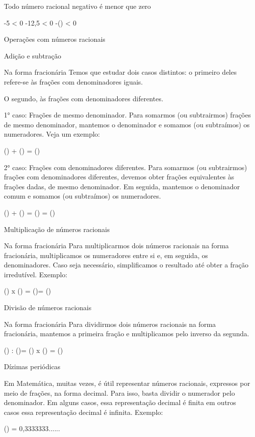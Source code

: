 Todo número racional negativo é menor que zero

-5 \textless{} 0 -12,5 \textless{} 0 -() \textless{} 0

Operações com números racionais

Adição e subtração

Na forma fracionária Temos que estudar dois casos distintos: o primeiro
deles refere-se às frações com denominadores iguais.

O segundo, às frações com denominadores diferentes.

1° caso: Frações de mesmo denominador. Para somarmos (ou subtrairmos)
frações de mesmo denominador, mantemos o denominador e somamos (ou
subtraímos) os numeradores. Veja um exemplo:

() + () = ()

2° caso: Frações com denominadores diferentes. Para somarmos (ou
subtrairmos) frações com denominadores diferentes, devemos obter frações
equivalentes às frações dadas, de mesmo denominador. Em seguida,
mantemos o denominador comum e somamos (ou subtraímos) os numeradores.

() + () = () =
()

Multiplicação de números racionais

Na forma fracionária Para multiplicarmos dois números racionais na forma
fracionária, multiplicamos os numeradores entre si e, em seguida, os
denominadores. Caso seja necessário, simplificamos o resultado até obter
a fração irredutível. Exemplo:

() x () = ()= ()

Divisão de números racionais

Na forma fracionária Para dividirmos dois números racionais na forma
fracionária, mantemos a primeira fração e multiplicamos pelo inverso da
segunda.

() : ()= () x () =
()

Dízimas periódicas

Em Matemática, muitas vezes, é útil representar números racionais,
expressos por meio de frações, na forma decimal. Para isso, basta
dividir o numerador pelo denominador. Em alguns casos, essa
representação decimal é finita em outros casos essa representação
decimal é infinita. Exemplo:

() = 0,3333333......

